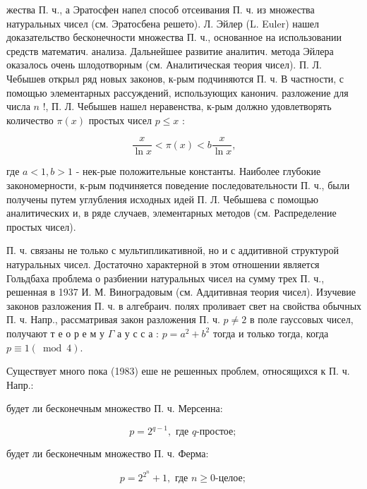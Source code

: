\documentclass[10pt]{article}
\begin{document}
жества П. ч., а Эратосфен напел способ отсеивания П. ч. из множества натуральных чисел (см. Эратосбена решето). Л. Эйлер (L. Euler) нашел доказательство бесконечности множества П. ч., основанное на использовании средств математич. анализа. Дальнейшее развитие аналитич. метода Эйлера оказалось очень шлодотворным (см. Аналитическая теория чисел). П. Л. Чебышев открыл ряд новых законов, к-рым подчиняются П. ч. В частности, с помощью элементарных рассуждений, использующих канонич. разложение для числа $n$ !, П. Л. Чебышев нашел неравенства, к-рым должно удовлетворять количество $\pi(x)$ простых чисел $p \leqslant x$ :



\[

\frac{x}{\ln x}<\pi(x)<b \frac{x}{\ln x},

\]



где $a<1, b>1$ - нек-рые положительные константы. Наиболее глубокие закономерности, к-рым подчиняется поведение последовательности П. ч., были получены путем углубления исходных идей П. Л. Чебышева с помощью аналитических и, в ряде случаев, элементарных методов (см. Распределение простых чисел).



П. ч. связаны не только с мультипликативной, но и с аддитивной структурой натуральных чисел. Достаточно характерной в этом отношении является Гольдбаха проблема о разбиении натуральных чисел на сумму трех П. ч., решенная в 1937 И. М. Виноградовым (см. Аддитивная теория чисел). Изучевие законов разложения П. ч. в алгебраич. полях проливает свет на свойства обычных П. ч. Напр., рассматривая закон разложения П. ч. $p \neq 2$ в поле гауссовых чисел, получают т е о р е м у $\Gamma$ а у с с а : $p=a^{2}+b^{2}$ тогда и только тогда, когда $p \equiv 1(\bmod 4)$.



Существует много пока (1983) еше не решенных проблем, относящихся к П. ч. Напр.:



будет ли бесконечным множество П. ч. Мерсенна:



\[

p=2^{q-1}, \text { где } q \text {-простое; }

\]



будет ли бесконечным множество П. ч. Ферма:



\[

p=2^{2^{n}}+1, \text { где } n \geqslant 0 \text {-целое; }

\]
\end{document}
